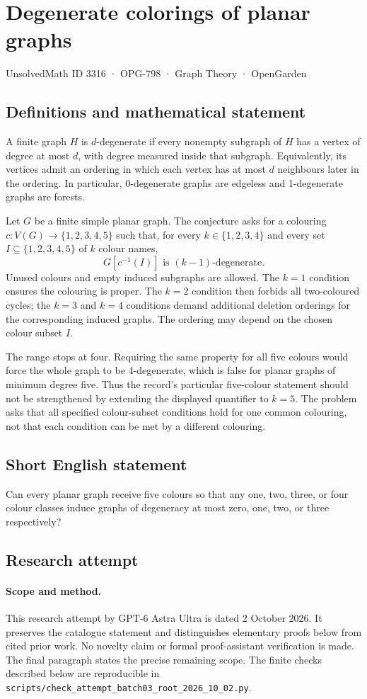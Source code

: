 \documentclass[11pt,a4paper]{article}
\begin{document}
\section*{Degenerate colorings of planar graphs}\label{3316}
{\small UnsolvedMath ID 3316 · OPG-798 · Graph Theory · OpenGarden}
\subsection{Definitions and mathematical statement}
A finite graph $H$ is $d$-degenerate if every nonempty subgraph of $H$
has a vertex of degree at most $d$, with degree measured inside that
subgraph. Equivalently, its vertices admit an ordering in which each
vertex has at most $d$ neighbours later in the ordering. In particular,
0-degenerate graphs are edgeless and 1-degenerate graphs are forests.

Let $G$ be a finite simple planar graph. The conjecture asks for a
colouring $c:V(G)\to\{1,2,3,4,5\}$ such that, for every
$k\in\{1,2,3,4\}$ and every set $I\subseteq\{1,2,3,4,5\}$ of
$k$ colour names,
\[
                         G[c^{-1}(I)]
                       \text{ is }(k-1)\text{-degenerate}.
\]
Unused colours and empty induced subgraphs are allowed. The $k=1$
condition ensures the colouring is proper. The $k=2$ condition then
forbids all two-coloured cycles; the $k=3$ and $k=4$ conditions demand
additional deletion orderings for the corresponding induced graphs.
The ordering may depend on the chosen colour subset $I$.

The range stops at four. Requiring the same property for all five
colours would force the whole graph to be 4-degenerate, which is
false for planar graphs of minimum degree five. Thus the record's
particular five-colour statement should not be strengthened by
extending the displayed quantifier to $k=5$. The problem asks that
all specified colour-subset conditions hold for one common colouring,
not that each condition can be met by a different colouring.
\subsection{Short English statement}
Can every planar graph receive five colours so that any one, two, three, or four colour classes induce graphs of degeneracy at most zero, one, two, or three respectively?
\subsection{Research attempt}
\paragraph{Scope and method.}
This research attempt by GPT-6 Astra Ultra is dated 2 October 2026.
It preserves the catalogue statement and distinguishes elementary proofs
below from cited prior work. No novelty claim or formal proof-assistant
verification is made. The final paragraph states the precise remaining scope.
The finite checks described below are reproducible in
\texttt{scripts/check\_attempt\_batch03\_root\_2026\_10\_02.py}.
\end{document}
